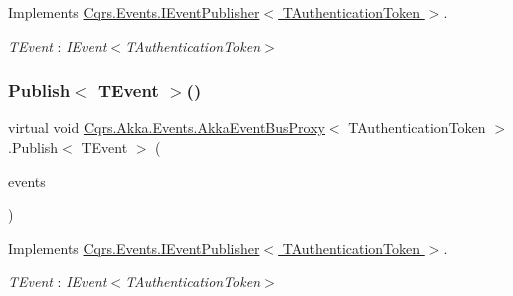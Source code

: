 Implements \hyperlink{interfaceCqrs_1_1Events_1_1IEventPublisher_a02f0db0bc9b3aa1c7f766f58f8422ee3}{Cqrs.\+Events.\+I\+Event\+Publisher$<$ T\+Authentication\+Token $>$}.

\begin{Desc}
\item[Type Constraints]\begin{description}
\item[{\em T\+Event} : {\em I\+Event$<$T\+Authentication\+Token$>$}]\end{description}
\end{Desc}
\mbox{\label{classCqrs_1_1Akka_1_1Events_1_1AkkaEventBusProxy_af4c202eaab00ed2fb6160d5b114d935c}} 
\subsubsection{\texorpdfstring{Publish$<$ T\+Event $>$()}{Publish< TEvent >()}\hspace{0.1cm}{\footnotesize\ttfamily [2/2]}}
{\footnotesize\ttfamily virtual void \hyperlink{classCqrs_1_1Akka_1_1Events_1_1AkkaEventBusProxy}{Cqrs.\+Akka.\+Events.\+Akka\+Event\+Bus\+Proxy}$<$ T\+Authentication\+Token $>$.Publish$<$ T\+Event $>$ (\begin{DoxyParamCaption}\item[{I\+Enumerable$<$ T\+Event $>$}]{events }\end{DoxyParamCaption})\hspace{0.3cm}{\ttfamily [virtual]}}



Implements \hyperlink{interfaceCqrs_1_1Events_1_1IEventPublisher_a2cbcc3d2c24d015abef6337714ec51ff}{Cqrs.\+Events.\+I\+Event\+Publisher$<$ T\+Authentication\+Token $>$}.

\begin{Desc}
\item[Type Constraints]\begin{description}
\item[{\em T\+Event} : {\em I\+Event$<$T\+Authentication\+Token$>$}]\end{description}
\end{Desc}


